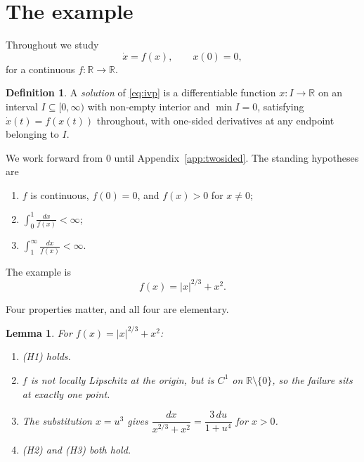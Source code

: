 \documentclass[12pt]{article}
\theoremstyle{plain}
\newtheorem{lemma}[theorem]{Lemma}
\theoremstyle{definition}
\newtheorem{definition}[theorem]{Definition}
\theoremstyle{remark}
\newcommand{\R}{\mathbb{R}}
\begin{document}
\section{The example}\label{sec:example}

Throughout we study
\begin{equation}\label{eq:ivp}
  \dot x = f(x), \qquad x(0)=0,
\end{equation}
for a continuous $f\colon\R\to\R$.

\begin{definition}\label{def:solution}
A \emph{solution} of \eqref{eq:ivp} is a differentiable function $x\colon I\to\R$
on an interval $I\subseteq[0,\infty)$ with non-empty interior and $\min I = 0$,
satisfying $\dot x(t)=f(x(t))$ throughout, with one-sided derivatives at any
endpoint belonging to $I$.
\end{definition}

We work forward from $0$ until Appendix~\ref{app:twosided}. The standing
hypotheses are
\begin{enumerate}
  \item[(H1)] $f$ is continuous, $f(0)=0$, and $f(x)>0$ for $x\ne 0$;
  \item[(H2)] $\displaystyle\int_{0}^{1}\frac{dx}{f(x)}<\infty$;
  \item[(H3)] $\displaystyle\int_{1}^{\infty}\frac{dx}{f(x)}<\infty$.
\end{enumerate}

The example is
\[
  \boxed{\,f(x)=|x|^{2/3}+x^{2}.\,}
\]

Four properties matter, and all four are elementary.

\begin{lemma}\label{lem:properties}
For $f(x)=|x|^{2/3}+x^{2}$:
\begin{enumerate}
  \item[(i)] \textup{(H1)} holds.
  \item[(ii)] $f$ is not locally Lipschitz at the origin, but is $C^{1}$ on
        $\R\setminus\{0\}$, so the failure sits at exactly one point.
  \item[(iii)] The substitution $x=u^{3}$ gives
        $\dfrac{dx}{x^{2/3}+x^{2}}=\dfrac{3\,du}{1+u^{4}}$ for $x>0$.
  \item[(iv)] \textup{(H2)} and \textup{(H3)} both hold.
\end{enumerate}
\end{lemma}
\end{document}
